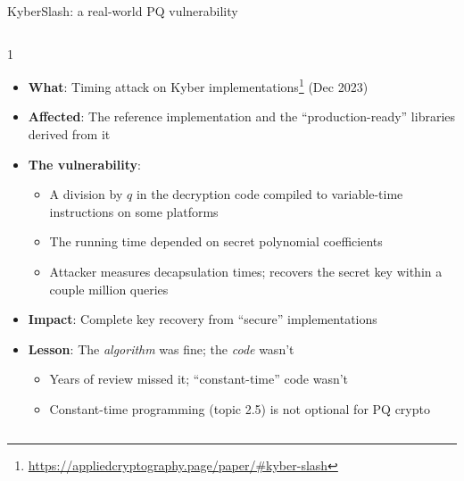 \ifdefined\PRESENTATION\else\PassOptionsToClass{handout}{beamer}\fi\documentclass[aspectratio=169, lualatex]{beamer}
\begin{document}
\begin{frame}{KyberSlash: a real-world PQ vulnerability}
	\begin{columns}[c]
		\begin{column}{1\textwidth}
			\begin{itemize}
				\item \textbf{What}: Timing attack on Kyber implementations\footnote{\url{https://appliedcryptography.page/paper/\#kyber-slash}} (Dec 2023)
				\item \textbf{Affected}: The reference implementation and the ``production-ready'' libraries derived from it
				\item \textbf{The vulnerability}:
				      \begin{itemize}
					      \item A division by $q$ in the decryption code compiled to variable-time instructions on some platforms
					      \item The running time depended on secret polynomial coefficients
					      \item Attacker measures decapsulation times; recovers the secret key within a couple million queries
				      \end{itemize}
				\item \textbf{Impact}: Complete key recovery from ``secure'' implementations
				\item \textbf{Lesson}: The \textit{algorithm} was fine; the \textit{code} wasn't
				      \begin{itemize}
					      \item Years of review missed it; ``constant-time'' code wasn't
					      \item Constant-time programming (topic 2.5) is not optional for PQ crypto
				      \end{itemize}
			\end{itemize}
		\end{column}
	\end{columns}
\end{frame}
\end{document}
